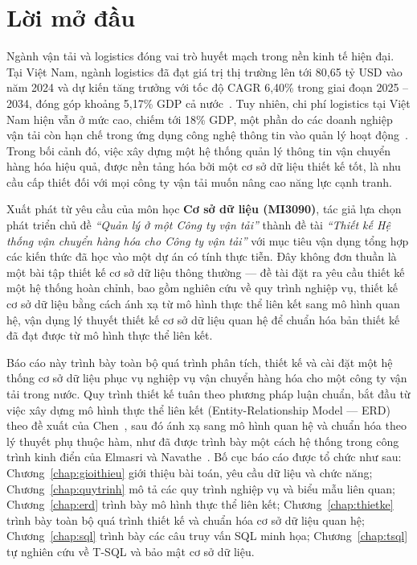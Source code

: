 \documentclass[11pt]{report}
\begin{document}
\chapter*{Lời mở đầu}
\thispagestyle{empty}
Ngành vận tải và logistics đóng vai trò huyết mạch trong nền kinh tế hiện đại. Tại Việt Nam, ngành logistics đã đạt giá trị thị trường lên tới 80,65 tỷ USD vào năm 2024 và dự kiến tăng trưởng với tốc độ CAGR 6,40\% trong giai đoạn 2025 -- 2034, đóng góp khoảng 5,17\% GDP cả nước~\cite{researchmarkets2024vietnam}. Tuy nhiên, chi phí logistics tại Việt Nam hiện vẫn ở mức cao, chiếm tới 18\% GDP, một phần do các doanh nghiệp vận tải còn hạn chế trong ứng dụng công nghệ thông tin vào quản lý hoạt động~\cite{bcompany2025vietnam}. Trong bối cảnh đó, việc xây dựng một hệ thống quản lý thông tin vận chuyển hàng hóa hiệu quả, được nền tảng hóa bởi một cơ sở dữ liệu thiết kế tốt, là nhu cầu cấp thiết đối với mọi công ty vận tải muốn nâng cao năng lực cạnh tranh.

Xuất phát từ yêu cầu của môn học \textbf{Cơ sở dữ liệu (MI3090)}, tác giả lựa chọn phát triển chủ đề \textit{``Quản lý ở một Công ty vận tải''} thành đề tài \textit{``Thiết kế Hệ thống vận chuyển hàng hóa cho Công ty vận tải''} với mục tiêu vận dụng tổng hợp các kiến thức đã học vào một dự án có tính thực tiễn. Đây không đơn thuần là một bài tập thiết kế cơ sở dữ liệu thông thường --- đề tài đặt ra yêu cầu thiết kế một hệ thống hoàn chỉnh, bao gồm nghiên cứu về quy trình nghiệp vụ, thiết kế cơ sở dữ liệu bằng cách ánh xạ từ mô hình thực thể liên kết sang mô hình quan hệ, vận dụng lý thuyết thiết kế cơ sở dữ liệu quan hệ để chuẩn hóa bản thiết kế đã đạt được từ mô hình thực thể liên kết.

Báo cáo này trình bày toàn bộ quá trình phân tích, thiết kế và cài đặt một hệ thống cơ sở dữ liệu phục vụ nghiệp vụ vận chuyển hàng hóa cho một công ty vận tải trong nước. Quy trình thiết kế tuân theo phương pháp luận chuẩn, bắt đầu từ việc xây dựng mô hình thực thể liên kết (Entity-Relationship Model --- ERD) theo đề xuất của Chen~\cite{chen1976entity}, sau đó ánh xạ sang mô hình quan hệ và chuẩn hóa theo lý thuyết phụ thuộc hàm, như đã được trình bày một cách hệ thống trong công trình kinh điển của Elmasri và Navathe~\cite{elmasri2015fundamentals}. Bố cục báo cáo được tổ chức như sau: Chương~\ref{chap:gioithieu} giới thiệu bài toán, yêu cầu dữ liệu và chức năng; Chương~\ref{chap:quytrinh} mô tả các quy trình nghiệp vụ và biểu mẫu liên quan; Chương~\ref{chap:erd} trình bày mô hình thực thể liên kết; Chương~\ref{chap:thietke} trình bày toàn bộ quá trình thiết kế và chuẩn hóa cơ sở dữ liệu quan hệ; Chương~\ref{chap:sql} trình bày các câu truy vấn SQL minh họa; Chương~\ref{chap:tsql} tự nghiên cứu về T-SQL và bảo mật cơ sở dữ liệu.
\end{document}
